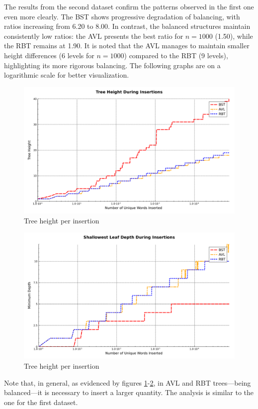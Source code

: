  The results from the second dataset confirm the patterns observed in the first one even more clearly.
 The BST shows progressive degradation of balancing, with ratios increasing from 6.20 to 8.00.
 In contrast, the balanced structures maintain consistently low ratios: the AVL presents the best ratio for $n=1000$ (1.50),
 while the RBT remains at 1.90. It is noted that the AVL manages to maintain smaller height differences (6 levels for $n=1000$)
 compared to the RBT (9 levels), highlighting its more rigorous balancing. The following graphs
 are on a logarithmic scale for better visualization.

 \begin{figure}[H]
     \centering
     \includegraphics[width=0.75\linewidth]{img/Graph_1_77770.pdf}
     \caption{Tree height per insertion}
     \label{fig:maiorgalho2}
 \end{figure}

 \begin{figure}[H]
     \centering
     \includegraphics[width=0.75\linewidth]{img/Graph_2_77770.pdf}
     \caption{Tree height per insertion}
     \label{fig:menorgalho2}
 \end{figure}

 Note that, in general, as evidenced by figures \ref{fig:maiorgalho2}-\ref{fig:menorgalho2}, in AVL and RBT trees—being balanced—it is necessary to insert a larger quantity. The analysis is similar to the one 
 for the first dataset.

